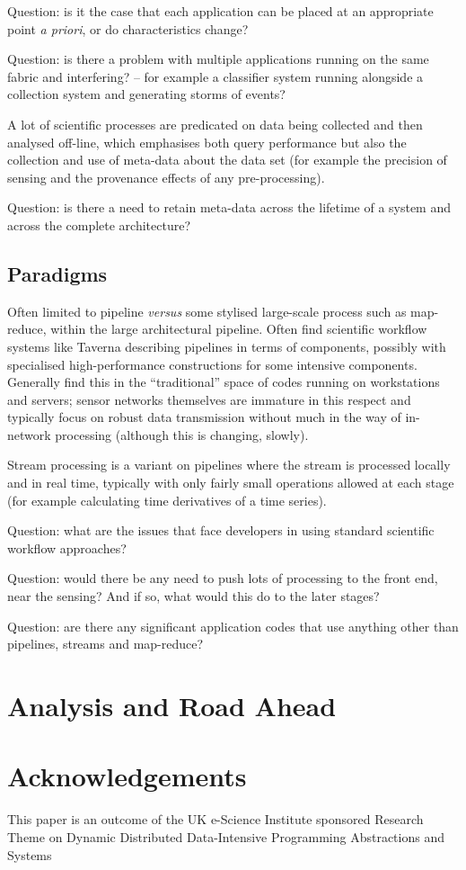 \documentclass[preprint,12pt]{article}
\begin{document}
Question: is it the case that each application can be placed at an
appropriate point \textit{a priori}, or do characteristics change?

Question: is there a problem with multiple applications running on the
same fabric and interfering? -- for example a classifier system
running alongside a collection system and generating storms of events?

A lot of scientific processes are predicated on data being collected
and then analysed off-line, which emphasises both query performance
but also the collection and use of meta-data about the data set (for
example the precision of sensing and the provenance effects of any
pre-processing).

Question: is there a need to retain meta-data across the lifetime of a
system and across the complete architecture?


\subsection{Paradigms}

Often limited to pipeline \textit{versus} some stylised large-scale
process such as map-reduce, within the large architectural
pipeline. Often find scientific workflow systems like Taverna
describing pipelines in terms of components, possibly with specialised
high-performance constructions for some intensive
components. Generally find this in the ``traditional'' space of codes
running on workstations and servers; sensor networks themselves are
immature in this respect and typically focus on robust data
transmission without much in the way of in-network processing
(although this is changing, slowly).

Stream processing is a variant on pipelines where the stream is
processed locally and in real time, typically with only fairly small
operations allowed at each stage (for example calculating time
derivatives of a time series).

Question: what are the issues that face developers in using standard
scientific workflow approaches?

Question: would there be any need to push lots of processing to the
front end, near the sensing? And if so, what would this do to the
later stages?

Question: are there any significant application codes that use
anything other than pipelines, streams and map-reduce?


\section{Analysis and Road Ahead}

\section*{Acknowledgements}
This paper is an outcome of the UK e-Science Institute sponsored
Research Theme on Dynamic Distributed Data-Intensive Programming
Abstractions and Systems



\end{document}
